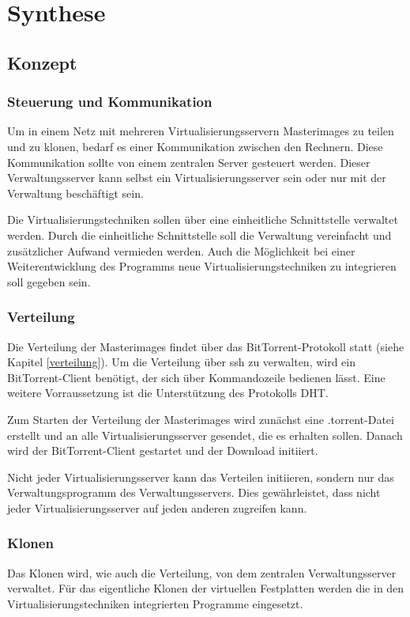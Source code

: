 \chapter{Synthese}
\section{Konzept}
\subsection{Steuerung und Kommunikation}
Um in einem Netz mit mehreren Virtualisierungsservern Masterimages zu teilen und zu klonen, bedarf es einer Kommunikation zwischen den Rechnern. Diese Kommunikation sollte von einem zentralen Server gesteuert werden. Dieser Verwaltungsserver kann selbst ein Virtualisierungsserver sein oder nur mit der Verwaltung beschäftigt sein.

Die Virtualisierungstechniken sollen über eine einheitliche Schnittstelle verwaltet werden. Durch die einheitliche Schnittstelle soll die Verwaltung vereinfacht und zusätzlicher Aufwand vermieden werden. Auch die Möglichkeit bei einer Weiterentwicklung des Programms neue Virtualisierungstechniken zu integrieren soll gegeben sein.

\subsection{Verteilung}
Die Verteilung der Masterimages findet über das BitTorrent-Protokoll statt (siehe Kapitel \ref{verteilung}). Um die Verteilung über ssh zu verwalten, wird ein BitTorrent-Client benötigt, der sich über Kommandozeile bedienen lässt. Eine weitere Vorraussetzung ist die Unterstützung des Protokolls DHT. 

Zum Starten der Verteilung der Masterimages wird zunächst eine .torrent-Datei erstellt und an alle Virtualisierungsserver gesendet, die es erhalten sollen. Danach wird der BitTorrent-Client gestartet und der Download initiiert.

Nicht jeder Virtualisierungsserver kann das Verteilen initiieren, sondern nur das Verwaltungsprogramm des Verwaltungsservers. Dies gewährleistet, dass nicht jeder Virtualisierungsserver auf jeden anderen zugreifen kann.

\subsection{Klonen}
Das Klonen wird, wie auch die Verteilung, von dem zentralen Verwaltungsserver verwaltet. Für das eigentliche Klonen der virtuellen Festplatten werden die in den Virtualisierungstechniken integrierten Programme eingesetzt. 

